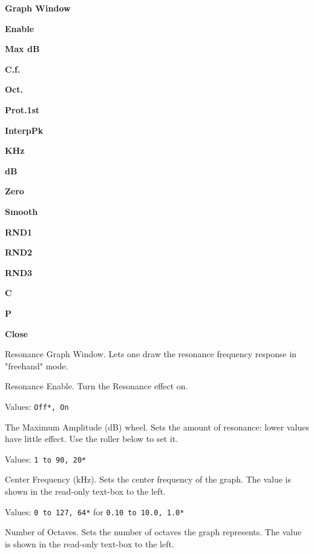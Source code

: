    \begin{enumber}
      \item \textbf{Graph Window}
      \item \textbf{Enable}
      \item \textbf{Max dB}
      \item \textbf{C.f.}
      \item \textbf{Oct.}
      \item \textbf{Prot.1st}
      \item \textbf{InterpPk}
      \item \textbf{KHz}
      \item \textbf{dB}
      \item \textbf{Zero}
      \item \textbf{Smooth}
      \item \textbf{RND1}
      \item \textbf{RND2}
      \item \textbf{RND3}
      \item \textbf{C}
      \item \textbf{P}
      \item \textbf{Close}
   \end{enumber}

   \setcounter{ItemCounter}{0}      %

   Resonance Graph Window.
   Lets one draw the resonance frequency response in "freehand" mode.

   Resonance Enable.
   Turn the Resonance effect on.

   Values: \texttt{Off*, On}

   The Maximum Amplitude (dB) wheel.
   Sets the amount of resonance: lower values have little effect. Use the
   roller below to set it. 

   Values: \texttt{1 to 90, 20*}

   Center Frequency (kHz).
   Sets the center frequency of the graph.
   The value is shown in the read-only text-box to the left.

   Values: \texttt{0 to 127, 64*} for \texttt{0.10 to 10.0, 1.0*}

   Number of Octaves.
   Sets the number of octaves the graph represents.
   The value is shown in the read-only text-box to the left.

